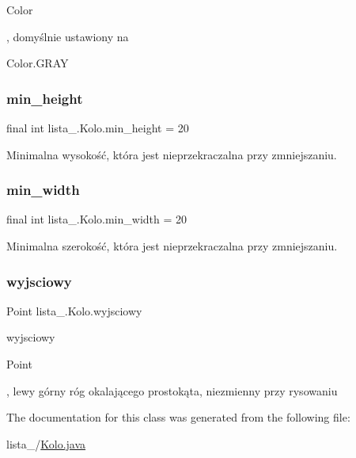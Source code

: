 \begin{DoxyCode}
Color 
\end{DoxyCode}
 , domyślnie ustawiony na
\begin{DoxyCode}
Color.GRAY 
\end{DoxyCode}
 \mbox{\label{classlista__5_1_1_kolo_a47a917d7de6905904717534ccd188037}} 
\subsubsection{\texorpdfstring{min\+\_\+height}{min\_height}}
{\footnotesize\ttfamily final int lista\+\_.\+Kolo.\+min\+\_\+height = 20\hspace{0.3cm}{\ttfamily [private]}}

Minimalna wysokość, która jest nieprzekraczalna przy zmniejszaniu. \mbox{\label{classlista__5_1_1_kolo_aed784d027c521026966005272339b054}} 
\subsubsection{\texorpdfstring{min\+\_\+width}{min\_width}}
{\footnotesize\ttfamily final int lista\+\_.\+Kolo.\+min\+\_\+width = 20\hspace{0.3cm}{\ttfamily [private]}}

Minimalna szerokość, która jest nieprzekraczalna przy zmniejszaniu. \mbox{\label{classlista__5_1_1_kolo_a6deef87b266a0c6c98fc920af90eb81a}} 
\subsubsection{\texorpdfstring{wyjsciowy}{wyjsciowy}}
{\footnotesize\ttfamily Point lista\+\_.\+Kolo.\+wyjsciowy\hspace{0.3cm}{\ttfamily [private]}}

wyjsciowy
\begin{DoxyCode}
Point 
\end{DoxyCode}
 , lewy górny róg okalającego prostokąta, niezmienny przy rysowaniu 

The documentation for this class was generated from the following file\+:\begin{DoxyCompactItemize}
\item 
lista\+\_/\mbox{\hyperlink{_kolo_8java}{Kolo.\+java}}\end{DoxyCompactItemize}
